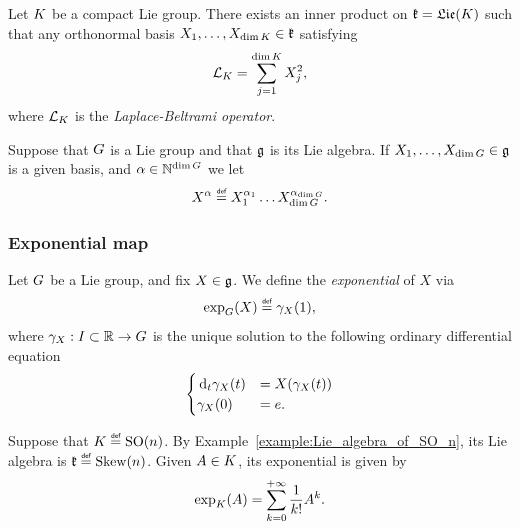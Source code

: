 \begin{lemma}
    Let $\CompactGroup$ be a compact Lie group.
    There exists an inner product on $\LieAlgebraCompactGroup = \Lie(\CompactGroup)$ such that
    any orthonormal basis $X_1, \dots, X_{\dim \CompactGroup} \in \LieAlgebraCompactGroup$ satisfying
    \begin{align*}
        \Laplacian [\CompactGroup] = \sum_{j = 1}^{\dim \CompactGroup} X_j^2,
    \end{align*}
    where $\Laplacian [\CompactGroup]$ is the \emph{Laplace-Beltrami operator}.
\end{lemma}

Suppose that $\Group$ is a Lie group
and that $\LieAlgebra$ is its Lie algebra.
If $X_1, \dots, X_{\dim \Group} \in \LieAlgebra$ is a given basis,
and $\alpha \in \N^{\dim \Group}$
we let
\begin{align*}
    X^\alpha \defeq X_1^{\alpha_1} \dots X_{\dim \Group}^{\alpha_{\dim \Group}}.
\end{align*}

\subsubsection{Exponential map}

\begin{definition}
    Let $\Group$ be a Lie group,
    and fix $X \in \LieAlgebra$.
    We define the \emph{exponential} of $X$ via
    \begin{align*}
        \exp_\Group(X) \defeq \gamma_X(1),
    \end{align*}
    where $\gamma_X : I \subset \R \to \Group$ is the unique solution to the following ordinary differential equation
    \begin{align*}
        \begin{cases}
            \D* 1 [\gamma_X] t(t) &= X(\gamma_X(t))\\
            \gamma_X(0) &= e.
        \end{cases}
    \end{align*}
\end{definition}

\begin{example}
    Suppose that $\CompactGroup \defeq \SpecialOrthogonalGroup n$.
    By Example~\ref{example:Lie_algebra_of_SO_n},
    its Lie algebra is $\LieAlgebraCompactGroup \defeq \SkewSymmetric n$.
    Given $A \in \CompactGroup$,
    its exponential is given by
    \begin{align*}
        \exp_\CompactGroup(A) = \sum_{k = 0}^{+\infty} \frac 1 {k!} A^k.
    \end{align*}
\end{example}

